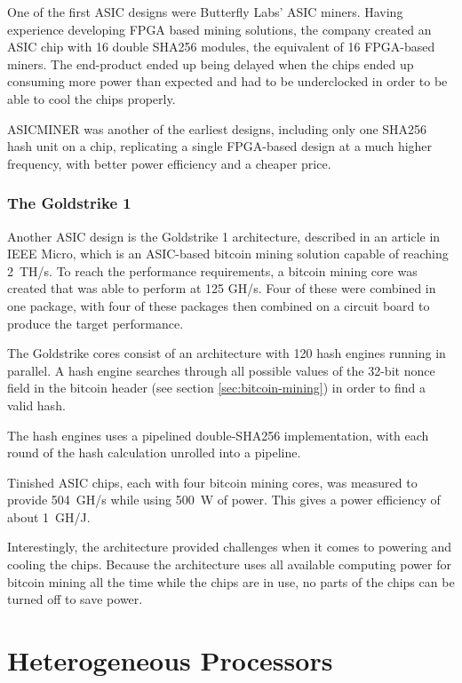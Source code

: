 One of the first ASIC designs were Butterfly Labs' ASIC miners. Having experience developing
FPGA based mining solutions, the company created an ASIC chip with 16 double SHA256 modules,
the equivalent of 16 FPGA-based miners. The end-product ended up being delayed when the chips
ended up consuming more power than expected and had to be underclocked in order to be able
to cool the chips properly.

ASICMINER was another of the earliest designs, including only one SHA256 hash unit on a chip,
replicating a single FPGA-based design at a much higher frequency, with better power efficiency
and a cheaper price. \cite{bespoke-silicon}

\subsubsection{The Goldstrike 1}
Another ASIC design is the Goldstrike 1 architecture, described in an article in IEEE Micro, which
is an ASIC-based bitcoin mining solution capable of reaching 2~TH/s. To reach the performance
requirements, a bitcoin mining core was created that was able to perform at 125 GH/s. Four of
these were combined in one package, with four of these packages then combined on a circuit board
to produce the target performance.

The Goldstrike cores consist of an architecture with 120 hash engines running in parallel.
A hash engine searches through all possible values of the 32-bit nonce field in the bitcoin header
(see section \ref{sec:bitcoin-mining}) in order to find a valid hash.

The hash engines uses a pipelined double-SHA256 implementation, with each round of the hash calculation
unrolled into a pipeline.

Tinished ASIC chips, each with four bitcoin mining cores, was measured to provide 504~GH/s while using
500~W of power. This gives a power efficiency of about 1~GH/J.

Interestingly, the architecture provided challenges when it comes to powering and cooling the chips.
Because the architecture uses all available computing power for bitcoin mining all the time while
the chips are in use, no parts of the chips can be turned off to save power. \cite{goldstrike}


\section{Heterogeneous Processors}

